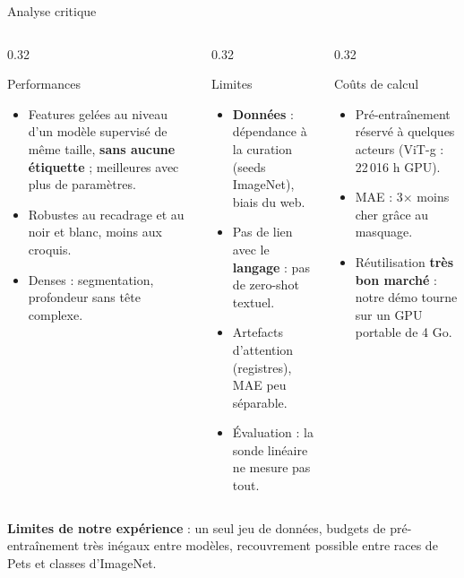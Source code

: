 \documentclass[aspectratio=169,10pt]{beamer}
\begin{document}
\begin{frame}{Analyse critique}
  \begin{columns}[T]
    \begin{column}{0.32\textwidth}
      \begin{exampleblock}{Performances}
        \footnotesize
        \begin{itemize}
          \item Features gelées au niveau d'un modèle supervisé de même taille, \textbf{sans aucune étiquette} ; meilleures avec plus de paramètres.
          \item Robustes au recadrage et au noir et blanc, moins aux croquis.
          \item Denses : segmentation, profondeur sans tête complexe.
        \end{itemize}
      \end{exampleblock}
    \end{column}
    \begin{column}{0.32\textwidth}
      \begin{alertblock}{Limites}
        \footnotesize
        \begin{itemize}
          \item \textbf{Données} : dépendance à la curation (seeds ImageNet), biais du web.
          \item Pas de lien avec le \textbf{langage} : pas de zero-shot textuel.
          \item Artefacts d'attention (registres), MAE peu séparable.
          \item Évaluation : la sonde linéaire ne mesure pas tout.
        \end{itemize}
      \end{alertblock}
    \end{column}
    \begin{column}{0.32\textwidth}
      \begin{block}{Coûts de calcul}
        \footnotesize
        \begin{itemize}
          \item Pré-entraînement réservé à quelques acteurs (ViT-g : 22\,016 h GPU).
          \item MAE : 3$\times$ moins cher grâce au masquage.
          \item Réutilisation \textbf{très bon marché} : notre démo tourne sur un GPU portable de 4 Go.
        \end{itemize}
      \end{block}
    \end{column}
  \end{columns}
  \vspace{2mm}
  \footnotesize\textbf{Limites de notre expérience} : un seul jeu de données, budgets de pré-entraînement très inégaux entre modèles, recouvrement possible entre races de Pets et classes d'ImageNet.
\end{frame}
\end{document}
